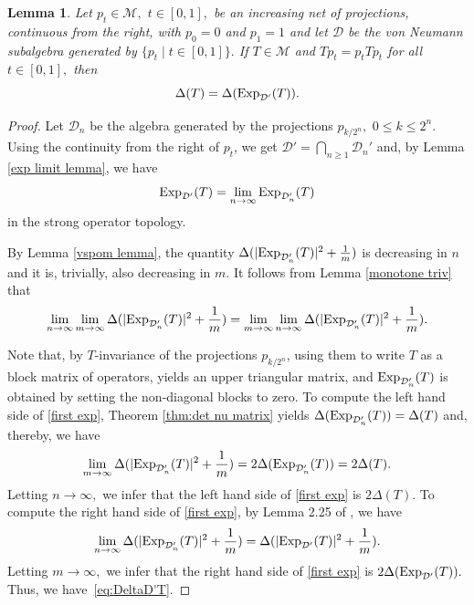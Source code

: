 \documentclass{amsart}
\theoremstyle{plain}
\newtheorem{lem}[thm]{Lemma}
\theoremstyle{remark}
\begin{document}
\begin{lem}\label{first exp lemma} Let $p_t\in\mathcal{M},$ $t\in[0,1],$ be an increasing net of projections,
continuous from the right, with $p_0=0$ and $p_1=1$ and let $\mathcal{D}$ be the von Neumann subalgebra generated by $\{p_t\mid t\in[0,1]\}.$ If $T\in\mathcal{M}$ and $Tp_t=p_tTp_t$ for all $t\in[0,1],$ then
\begin{equation}\label{eq:DeltaD'T}
\Delta(T)=\Delta({\rm Exp}_{\mathcal{D}'}(T)).
\end{equation}
\end{lem}
\begin{proof} Let $\mathcal{D}_n$ be the algebra generated by the projections $p_{k/2^n},$ $0\leq k\leq 2^n$.
Using the continuity from the right of $p_t$,
we get $\mathcal{D}'=\bigcap_{n\geq1}\mathcal{D}_n'$ and, by Lemma \ref{exp limit lemma}, we have
$${\rm Exp}_{\mathcal{D}'}(T)=\lim_{n\to\infty}{\rm Exp}_{\mathcal{D}_n'}(T)$$
in the strong operator topology.

By Lemma \ref{vspom lemma}, the quantity $\Delta(|{\rm Exp}_{\mathcal{D}_n'}(T)|^2+\frac1m)$ is decreasing in $n$ and it is, trivially, also decreasing in $m.$ It follows from Lemma \ref{monotone triv} that
\begin{equation}\label{first exp}
\lim_{n\to\infty}\lim_{m\to\infty}\Delta(|{\rm Exp}_{\mathcal{D}_n'}(T)|^2+\frac1m)=\lim_{m\to\infty}\lim_{n\to\infty}\Delta(|{\rm Exp}_{\mathcal{D}_n'}(T)|^2+\frac1m).
\end{equation}

Note that, by $T$-invariance of the projections $p_{k/2^n}$, using them to write $T$ as a block matrix of operators,
yields an upper triangular matrix, and ${\rm Exp}_{\mathcal{D}_n'}(T)$ is obtained by setting the non-diagonal blocks to zero.
To compute the left hand side of \eqref{first exp}, 
Theorem \ref{thm:det nu matrix} yields $\Delta({\rm Exp}_{\mathcal{D}_n'}(T))=\Delta(T)$ and, thereby, we have
$$\lim_{m\to\infty}\Delta(|{\rm Exp}_{\mathcal{D}_n'}(T)|^2+\frac1m)=2\Delta({\rm Exp}_{\mathcal{D}_n'}(T))=2\Delta(T).$$
Letting $n\to\infty,$ we infer that the left hand side of \eqref{first exp} is $2\Delta(T)$.
To compute the right hand side of \eqref{first exp}, by Lemma 2.25 of \cite{HS1}, we have
$$\lim_{n\to\infty}\Delta(|{\rm Exp}_{\mathcal{D}_n'}(T)|^2+\frac1m)=\Delta(|{\rm Exp}_{\mathcal{D}'}(T)|^2+\frac1m).$$
Letting $m\to\infty,$ we infer that the right hand side of \eqref{first exp} is $2\Delta({\rm Exp}_{\mathcal{D}'}(T)).$
Thus, we have~\eqref{eq:DeltaD'T}.
\end{proof}
\end{document}
